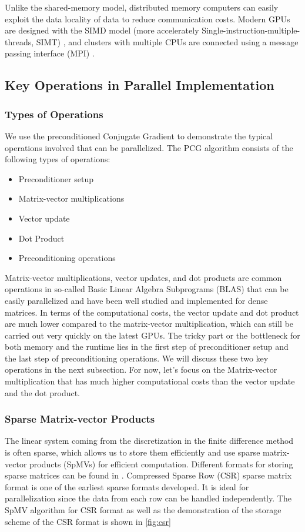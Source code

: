 Unlike the shared-memory model, distributed memory computers can easily exploit the data locality of data to reduce communication costs. Modern GPUs are designed with the SIMD model (more accelerately Single-instruction-multiple-threads, SIMT) \cite{owens2008gpu}, and clusters with multiple CPUs are connected using a message passing interface (MPI) \cite{barker2015message}.


\subsection{Key Operations in Parallel Implementation}
\subsubsection{Types of Operations}

We use the preconditioned Conjugate Gradient to demonstrate the typical operations involved that can be parallelized. The PCG algorithm consists of the following types of operations:
\begin{itemize}
    \item Preconditioner setup
    \item Matrix-vector multiplications
    \item Vector update
    \item Dot Product
    \item Preconditioning operations
\end{itemize}

Matrix-vector multiplications, vector updates, and dot products are common operations in so-called Basic Linear Algebra Subprograms (BLAS) that can be easily parallelized and have been well studied and implemented for dense matrices\cite{10.1145/77626.79170,chtchelkanova1997parallel,freeman1992parallel}. In terms of the computational costs, the vector update and dot product are much lower compared to the matrix-vector multiplication, which can still be carried out very quickly on the latest GPUs. The tricky part or the bottleneck for both memory and the runtime lies in the first step of preconditioner setup and the last step of preconditioning operations. We will discuss these two key operations in the next subsection. For now, let's focus on the Matrix-vector multiplication that has much higher computational costs than the vector update and the dot product.

\subsubsection{Sparse Matrix-vector Products}
The linear system coming from the discretization in the finite difference method is often sparse, which allows us to store them efficiently and use sparse matrix-vector products (SpMVs) for efficient computation. Different formats for storing sparse matrices can be found in \cite{doi:10.1137/1.9780898718003}. Compressed Sparse Row (CSR) sparse matrix format is one of the earliest sparse formats developed. It is ideal for parallelization since the data from each row can be handled independently. The SpMV algorithm for CSR format as well as the demonstration of the storage scheme of the CSR format is shown in \autoref{fig:csr}

